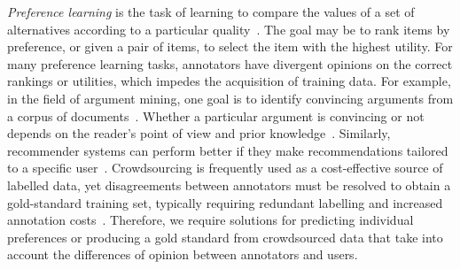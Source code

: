 %
\emph{Preference learning} is the task of learning to compare the values of a set of alternatives
according to a particular quality~\citep{furnkranz2010preference}. The goal may be to 
rank items by preference, or given a pair of items, to select the item with the highest utility.
For many preference learning tasks, annotators have divergent opinions on the correct rankings or utilities,
which impedes the acquisition of training data.
For example, in the field of argument mining, one goal is to 
identify convincing arguments from a corpus of documents~\citep{habernal2016argument}. 
Whether a particular argument is convincing or not depends on the reader's point of view and prior knowledge~\citep{lukin2017argument}.
Similarly, recommender systems can perform better if they make recommendations tailored
to a specific user~\citep{resnick1997recommender}.
Crowdsourcing is frequently used as a cost-effective source of labelled data, 
yet disagreements between annotators must be resolved to obtain a gold-standard
training set, typically requiring redundant labelling and increased annotation costs~\citep{snow2008cheap,banerji2010galaxy,gaunt2016training}.
Therefore, we require solutions for predicting individual preferences or 
producing a gold standard from crowdsourced data
that take into account the differences of opinion between annotators and users.



